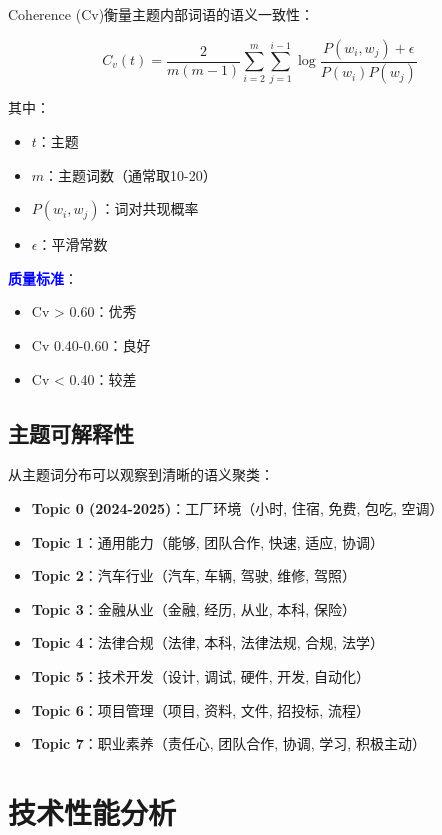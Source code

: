 \documentclass[11pt,a4paper]{article}
\begin{document}
Coherence (Cv)衡量主题内部词语的语义一致性：

\begin{equation}
C_v(t) = \frac{2}{m(m-1)} \sum_{i=2}^m \sum_{j=1}^{i-1} \log \frac{P(w_i, w_j) + \epsilon}{P(w_i)P(w_j)}
\end{equation}

其中：
\begin{itemize}
    \item $t$：主题
    \item $m$：主题词数（通常取10-20）
    \item $P(w_i, w_j)$：词对共现概率
    \item $\epsilon$：平滑常数
\end{itemize}

\textcolor{blue}{\textbf{质量标准}}：
\begin{itemize}
    \item Cv > 0.60：优秀
    \item Cv 0.40-0.60：良好
    \item Cv < 0.40：较差
\end{itemize}

\subsection{主题可解释性}

从主题词分布可以观察到清晰的语义聚类：

\begin{itemize}
    \item \textbf{Topic 0 (2024-2025)}：工厂环境（小时, 住宿, 免费, 包吃, 空调）
    \item \textbf{Topic 1}：通用能力（能够, 团队合作, 快速, 适应, 协调）
    \item \textbf{Topic 2}：汽车行业（汽车, 车辆, 驾驶, 维修, 驾照）
    \item \textbf{Topic 3}：金融从业（金融, 经历, 从业, 本科, 保险）
    \item \textbf{Topic 4}：法律合规（法律, 本科, 法律法规, 合规, 法学）
    \item \textbf{Topic 5}：技术开发（设计, 调试, 硬件, 开发, 自动化）
    \item \textbf{Topic 6}：项目管理（项目, 资料, 文件, 招投标, 流程）
    \item \textbf{Topic 7}：职业素养（责任心, 团队合作, 协调, 学习, 积极主动）
\end{itemize}

\section{技术性能分析}
\end{document}

